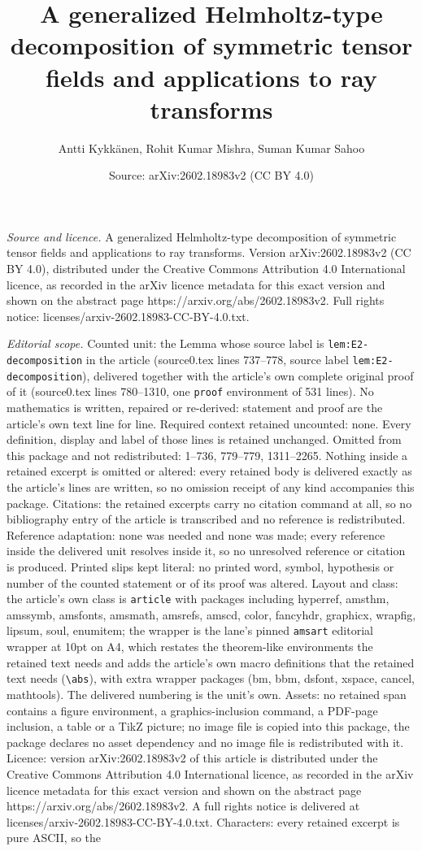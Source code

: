 \documentclass[10pt,a4paper]{amsart}
\title[A generalized Helmholtz-type decomposition of symmetric tens]{A generalized Helmholtz-type decomposition of symmetric tensor fields and applications to ray transforms}
\author{Antti Kykk\"anen, Rohit Kumar Mishra, Suman Kumar Sahoo}
\date{Source: arXiv:2602.18983v2 (CC BY 4.0)}
\begin{document}
\maketitle

\noindent\emph{Source and licence.} A generalized Helmholtz-type decomposition of symmetric tensor fields and applications to ray transforms. Version arXiv:2602.18983v2 (CC BY 4.0), distributed under the Creative Commons Attribution 4.0 International licence, as recorded in the arXiv licence metadata for this exact version and shown on the abstract page https://arxiv.org/abs/2602.18983v2. Full rights notice: licenses/arxiv-2602.18983-CC-BY-4.0.txt.\par\smallskip

\noindent\textit{Editorial scope.} Counted unit: the Lemma whose source label is \texttt{lem:E2-decomposition} in the article (source0.tex lines 737--778, source label \texttt{lem:E2-decomposition}), delivered together with the article's own complete original proof of it (source0.tex lines 780--1310, one \texttt{proof} environment of 531 lines). No mathematics is written, repaired or re-derived: statement and proof are the article's own text line for line. Required context retained uncounted: none. Every definition, display and label of those lines is retained unchanged. Omitted from this package and not redistributed: 1--736, 779--779, 1311--2265. Nothing inside a retained excerpt is omitted or altered: every retained body is delivered exactly as the article's lines are written, so no omission receipt of any kind accompanies this package. Citations: the retained excerpts carry no citation command at all, so no bibliography entry of the article is transcribed and no reference is redistributed. Reference adaptation: none was needed and none was made; every reference inside the delivered unit resolves inside it, so no unresolved reference or citation is produced. Printed slips kept literal: no printed word, symbol, hypothesis or number of the counted statement or of its proof was altered. Layout and class: the article's own class is \texttt{article} with packages including hyperref, amsthm, amssymb, amsfonts, amsmath, amsrefs, amscd, color, fancyhdr, graphicx, wrapfig, lipsum, soul, enumitem; the wrapper is the lane's pinned \texttt{amsart} editorial wrapper at 10pt on A4, which restates the theorem-like environments the retained text needs and adds the article's own macro definitions that the retained text needs (\texttt{\textbackslash abs}), with extra wrapper packages (bm, bbm, dsfont, xspace, cancel, mathtools). The delivered numbering is the unit's own. Assets: no retained span contains a figure environment, a graphics-inclusion command, a PDF-page inclusion, a table or a TikZ picture; no image file is copied into this package, the package declares no asset dependency and no image file is redistributed with it. Licence: version arXiv:2602.18983v2 of this article is distributed under the Creative Commons Attribution 4.0 International licence, as recorded in the arXiv licence metadata for this exact version and shown on the abstract page https://arxiv.org/abs/2602.18983v2. A full rights notice is delivered at licenses/arxiv-2602.18983-CC-BY-4.0.txt. Characters: every retained excerpt is pure ASCII, so the 
\end{document}
